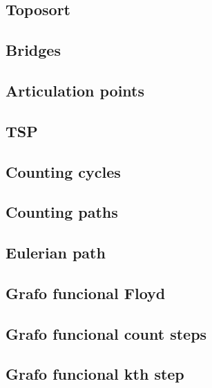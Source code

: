 \subsection{Toposort}
\raggedbottom
\hrulefill
\subsection{Bridges}
\raggedbottom
\hrulefill
\subsection{Articulation points}
\raggedbottom
\hrulefill
\subsection{TSP}
\raggedbottom
\hrulefill
\subsection{Counting cycles}
\raggedbottom
\hrulefill
\subsection{Counting paths}
\raggedbottom
\hrulefill
\subsection{Eulerian path}
\raggedbottom
\hrulefill
\subsection{Grafo funcional Floyd}
\raggedbottom
\hrulefill
\subsection{Grafo funcional count steps}
\raggedbottom
\hrulefill
\subsection{Grafo funcional kth step}
\raggedbottom
\hrulefill

